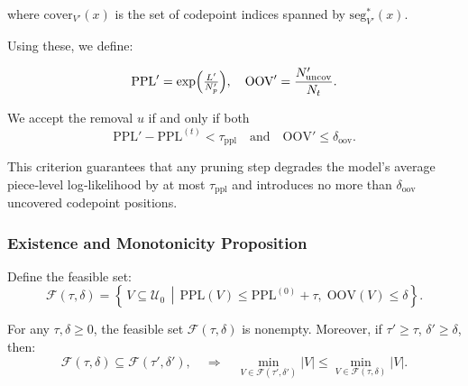 where \(\mathrm{cover}_{V'}(x)\) is the set of codepoint indices spanned by \(\mathrm{seg}^{*}_{V'}(x)\).

Using these, we define:

\[
\mathrm{PPL}' 
= \exp\Bigl(\tfrac{L'}{N_{p}'}\Bigr),
\quad
\mathrm{OOV}' 
= \frac{N_{\mathrm{uncov}}'}{N_{t}}.
\]

We accept the removal \(u\) if and only if both
\[
\mathrm{PPL}' - \mathrm{PPL}^{(t)} < \tau_{\mathrm{ppl}}
\quad\text{and}\quad
\mathrm{OOV}' \le \delta_{\mathrm{oov}}.
\]

This criterion guarantees that any pruning step degrades the model’s average piece‐level log‐likelihood by at most \(\tau_{\mathrm{ppl}}\) and introduces no more than \(\delta_{\mathrm{oov}}\) uncovered codepoint positions.









\subsubsection{Existence and Monotonicity Proposition}

Define the feasible set:
\[
\mathcal F(\tau,\delta)
= \left\{\,V\subseteq\mathcal U_{0}\,\middle|\,
\mathrm{PPL}(V)\le \mathrm{PPL}^{(0)}+\tau,\;
\mathrm{OOV}(V)\le \delta
\right\}.
\]

\begin{proposition}
	For any \(\tau,\delta \ge 0\), the feasible set \(\mathcal F(\tau,\delta)\) is nonempty. Moreover, if \(\tau' \ge \tau\), \(\delta' \ge \delta\), then:
	\[
	\mathcal F(\tau,\delta) \subseteq \mathcal F(\tau',\delta'),
	\quad
	\Rightarrow
	\quad
	\min_{V\in\mathcal F(\tau',\delta')}|V| \le \min_{V\in\mathcal F(\tau,\delta)}|V|.
	\]
\end{proposition}

